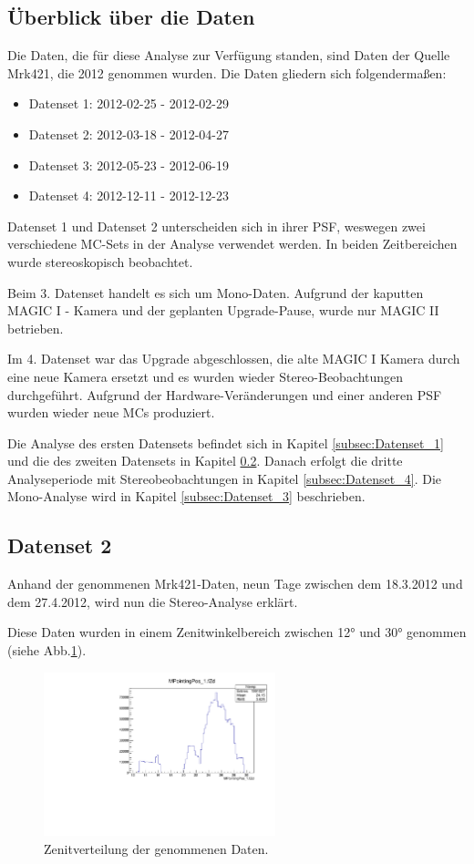 \subsection{Überblick über die Daten}
Die Daten, die für diese Analyse zur Verfügung standen, sind Daten der Quelle Mrk421, die 2012 genommen wurden.
Die Daten gliedern sich folgendermaßen:

\begin{itemize}
 \item Datenset 1: 2012-02-25 - 2012-02-29
 \item Datenset 2: 2012-03-18 - 2012-04-27
 \item Datenset 3: 2012-05-23 - 2012-06-19
 \item Datenset 4: 2012-12-11 - 2012-12-23
\end{itemize}

Datenset 1 und Datenset 2 unterscheiden sich in ihrer PSF, weswegen zwei verschiedene MC-Sets in der Analyse verwendet werden.
In beiden Zeitbereichen wurde stereoskopisch beobachtet.

Beim 3. Datenset handelt es sich um Mono-Daten. 
Aufgrund der kaputten MAGIC I - Kamera und der geplanten Upgrade-Pause, wurde nur MAGIC II betrieben.

Im 4. Datenset war das Upgrade abgeschlossen, die alte MAGIC I Kamera durch eine neue Kamera ersetzt und es wurden wieder Stereo-Beobachtungen durchgeführt.
Aufgrund der Hardware-Veränderungen und einer anderen PSF wurden wieder neue MCs produziert.

Die Analyse des ersten Datensets befindet sich in Kapitel \ref{subsec:Datenset_1} und die des zweiten Datensets in Kapitel \ref{subsec:Datenset_2}.
Danach erfolgt die dritte Analyseperiode mit Stereobeobachtungen in Kapitel \ref{subsec:Datenset_4}.
Die Mono-Analyse wird in Kapitel \ref{subsec:Datenset_3} beschrieben.


\subsection{Datenset 2}
\label{subsec:Datenset_2}
Anhand der genommenen Mrk421-Daten, neun Tage zwischen dem 18.3.2012 und dem 27.4.2012, wird nun die Stereo-Analyse erklärt.

Diese Daten wurden in einem Zenitwinkelbereich zwischen 12° und 30° genommen (siehe Abb.\ref{Datenset2_fZD}).

\begin{figure}
    \centering
    \includegraphics[width=0.6\textwidth]{./Plots/04_MrkAnalyse/Datenset2/Mrk421_Part2.pdf}
    \caption{Zenitverteilung der genommenen Daten.}
    \label{Datenset2_fZD}
\end{figure}


